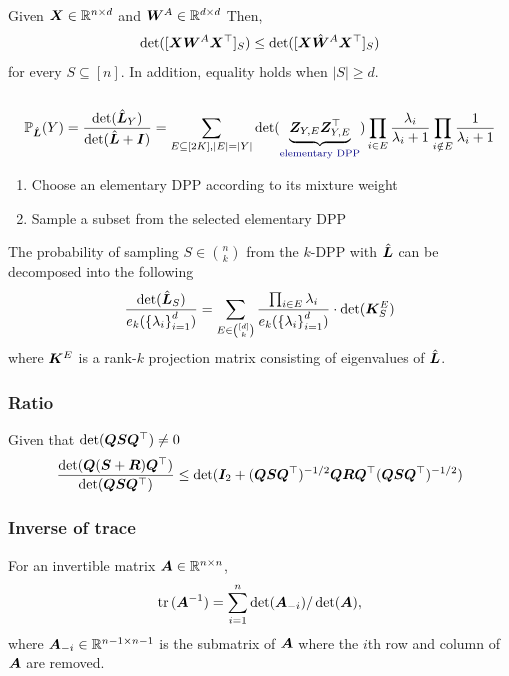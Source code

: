 \documentclass[10pt]{article}
\begin{document}
Given ${\bm{X}} \in \mathbb{R}^{n \times d}$ and ${\bm{W}}^A \in \mathbb{R}^{d \times d}$ Then, 
\begin{equation}
    \det( [{\bm{X}} {\bm{W}}^A {\bm{X}}^{\top}]_S ) \leq \det ( [ {\bm{X}} \hat{{\bm{W}}}^A {\bm{X}}^{\top}]_S ) 
\end{equation}
for every $S \subseteq [n]$. In addition, equality holds when $|S| \geq d$.  \\~\\
\begin{equation}
\pr_{\hat{\mL}}(Y) = \frac{\det (\hat{\mL}_Y)}{\det (\hat{\mL} + \mI)} = \sum_{E \subseteq[2K], |E| = |Y|} \det (\underbrace{\mZ_{Y,E} \mZ_{Y,E}^{\top}}_{\memo{elementary DPP}})  \prod_{i \in E} \frac{\lambda_i}{\lambda_i +1} \prod_{i \notin E} \frac{1}{\lambda_i +1} 
\end{equation}
\begin{enumerate}
    \item Choose an elementary DPP according to its mixture weight 
    \item Sample a subset from the selected elementary DPP \\
\end{enumerate}
The probability of sampling $S \in \binom{n}{k}$ from the $k$-DPP with $\hat{{\bm{L}}}$ can be decomposed into the following 
\begin{equation}
    \frac{\det (\hat{{\bm{L}}}_S)}{e_k (\left\{ \lambda_i \right\}_{i=1}^d)} = \sum_{E \in \binom{[d]}{k}} \frac{\prod_{i \in E} \lambda_i}{e_k ( \left\{ \lambda_i \right\}_{i=1}^d)} \cdot \det ({\bm{K}}_S^E) 
\end{equation}
where ${\bm{K}}^E$ is a rank-$k$ projection matrix consisting of eigenvalues of $\hat{{\bm{L}}}$. 
\subsubsection{Ratio}
Given that $\det ({\bm{Q}} {\bm{S}} {\bm{Q}}^{\top}) \neq 0$
\begin{equation}
    \frac{\det ({\bm{Q}} ({\bm{S}} + {\bm{R}} ) {\bm{Q}}^{\top})}{\det ({\bm{Q}} {\bm{S}} {\bm{Q}}^{\top})} \leq \det({\bm{I}}_2 + ({\bm{Q}} {\bm{S}} {\bm{Q}}^{\top})^{-1/2} {\bm{Q}} {\bm{R}} {\bm{Q}}^{\top} ({\bm{Q}} {\bm{S}} {\bm{Q}}^{\top})^{-1/2})
\end{equation}
\subsubsection{Inverse of trace}
For an invertible matrix ${\bm{A}} \in \mathbb{R}^{n \times n}$, 
\begin{equation}
    \mathrm{tr}\,({{\bm{A}}^{-1}}) = \sum_{i=1}^n \det ({\bm{A}}_{-i}) / \det ({\bm{A}}),
\end{equation}
where ${\bm{A}}_{-i} \in \mathbb{R}^{n-1 \times n-1}$ is the submatrix of ${\bm{A}}$ where the $i$th row and column of ${\bm{A}}$ are removed.  
\end{document}

